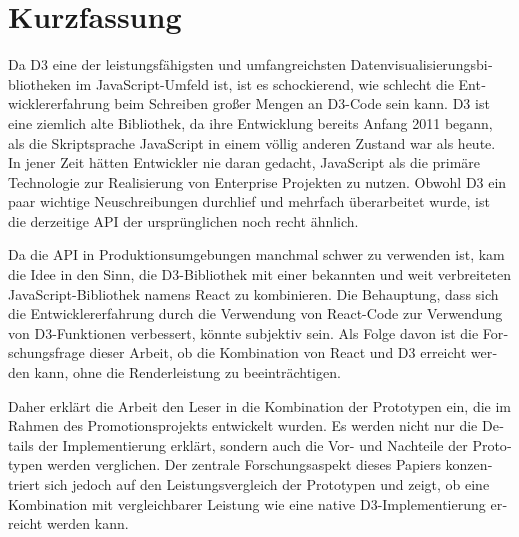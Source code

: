 \chapter{Kurzfassung}

\begin{german}
Da D3 eine der leistungsfähigsten und umfangreichsten Datenvisualisierungsbibliotheken im \mbox{JavaScript}-Umfeld ist, ist es schockierend, wie schlecht die Entwicklererfahrung beim Schreiben großer Mengen an D3-Code sein kann. D3 ist eine ziemlich alte Bibliothek, da ihre Entwicklung bereits Anfang 2011 begann, als die Skriptsprache \mbox{JavaScript} in einem völlig anderen Zustand war als heute. In jener Zeit hätten Entwickler nie daran gedacht, \mbox{JavaScript} als die primäre Technologie zur Realisierung von Enterprise Projekten zu nutzen. Obwohl D3 ein paar wichtige Neuschreibungen durchlief und mehrfach überarbeitet wurde, ist die derzeitige API der ursprünglichen noch recht ähnlich. 

Da die API in Produktionsumgebungen manchmal schwer zu verwenden ist, kam die Idee in den Sinn, die D3-Bibliothek mit einer bekannten und weit verbreiteten JavaScript-Bibliothek namens React zu kombinieren. Die Behauptung, dass sich die Entwicklererfahrung durch die Verwendung von React-Code zur Verwendung von D3-Funktionen verbessert, könnte subjektiv sein. Als Folge davon ist die Forschungsfrage dieser Arbeit, ob die Kombination von React und D3 erreicht werden kann, ohne die Renderleistung zu beeinträchtigen. 

Daher erklärt die Arbeit den Leser in die Kombination der Prototypen ein, die im Rahmen des Promotionsprojekts entwickelt wurden. Es werden nicht nur die Details der Implementierung erklärt, sondern auch die Vor- und Nachteile der Prototypen werden verglichen. Der zentrale Forschungsaspekt dieses Papiers konzentriert sich jedoch auf den Leistungsvergleich der Prototypen und zeigt, ob eine Kombination mit vergleichbarer Leistung wie eine native D3-Implementierung erreicht werden kann.
\end{german}